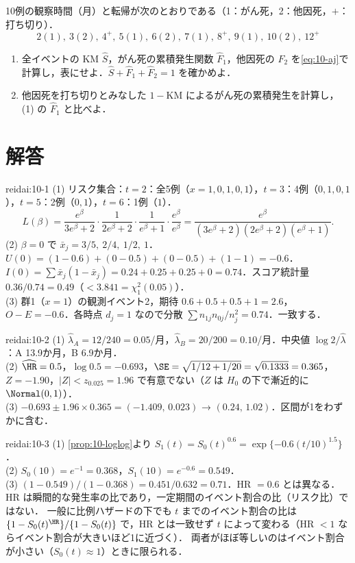 \begin{reidai}[累積発生関数の推定]\label{reidai:10-5}
10例の観察時間（月）と転帰が次のとおりである（1：がん死，2：他因死，$+$：打ち切り）．
\[
2(1),\ 3(2),\ 4^+,\ 5(1),\ 6(2),\ 7(1),\ 8^+,\ 9(1),\ 10(2),\ 12^+
\]
\begin{enumerate}[label=(\arabic*)]
\item 全イベントの KM $\hat S$，がん死の累積発生関数 $\hat F_1$，他因死の $\hat F_2$ を\cref{eq:10-aj}で計算し，表にせよ．$\hat S+\hat F_1+\hat F_2=1$ を確かめよ．
\item 他因死を打ち切りとみなした $1-\mathrm{KM}$ によるがん死の累積発生を計算し，(1) の $\hat F_1$ と比べよ．
\end{enumerate}
\end{reidai}

\section{解答}\label{sec:10-sol}
\begin{kaitou}{reidai:10-1}
(1) リスク集合：$t=2$：全5例（$x=1,0,1,0,1$），$t=3$：4例（$0,1,0,1$），$t=5$：2例（$0,1$），$t=6$：1例（$1$）．
\[
L(\beta)=\frac{e^\beta}{3e^\beta+2}\cdot\frac{1}{2e^\beta+2}\cdot\frac{1}{e^\beta+1}\cdot\frac{e^\beta}{e^\beta}
=\frac{e^\beta}{(3e^\beta+2)(2e^\beta+2)(e^\beta+1)}.
\]
(2) $\beta=0$ で $\bar x_j=3/5,\ 2/4,\ 1/2,\ 1$．$U(0)=(1-0.6)+(0-0.5)+(0-0.5)+(1-1)=-0.6$．
$I(0)=\sum\bar x_j(1-\bar x_j)=0.24+0.25+0.25+0=0.74$．スコア統計量 $0.36/0.74=0.49$（$<3.841=\chi^2_1(0.05)$）．\\
(3) 群1（$x=1$）の観測イベント2，期待 $0.6+0.5+0.5+1=2.6$，$O-E=-0.6$．各時点 $d_j=1$ なので分散 $\sum n_{1j}n_{0j}/n_j^2=0.74$．一致する．
\end{kaitou}

\begin{kaitou}{reidai:10-2}
(1) $\hat\lambda_A=12/240=0.05$/月，$\hat\lambda_B=20/200=0.10$/月．中央値 $\log2/\hat\lambda$：A 13.9か月，B 6.9か月．\\
(2) $\widehat{\HR}=0.5$，$\log0.5=-0.693$，$\SE=\sqrt{1/12+1/20}=\sqrt{0.1333}=0.365$，$Z=-1.90$，$|Z|<z_{0.025}=1.96$ で有意でない（$Z$ は $H_0$ の下で漸近的に $\Normal(0,1)$）．\\
(3) $-0.693\pm1.96\times0.365=(-1.409,\,0.023)$ → $(0.24,\,1.02)$．区間が1をわずかに含む．
\end{kaitou}

\begin{kaitou}{reidai:10-3}
(1) \cref{prop:10-loglog}より $S_1(t)=S_0(t)^{0.6}=\exp\{-0.6(t/10)^{1.5}\}$．\\
(2) $S_0(10)=e^{-1}=0.368$，$S_1(10)=e^{-0.6}=0.549$．\\
(3) $(1-0.549)/(1-0.368)=0.451/0.632=0.71$．HR $=0.6$ とは異なる．HR は瞬間的な発生率の比であり，一定期間のイベント割合の比（リスク比）ではない．
一般に比例ハザードの下でも $t$ までのイベント割合の比は $\{1-S_0(t)^{\HR}\}/\{1-S_0(t)\}$ で，HR とは一致せず $t$ によって変わる（HR $<1$ ならイベント割合が大きいほど1に近づく）．
両者がほぼ等しいのはイベント割合が小さい（$S_0(t)\approx1$）ときに限られる．
\end{kaitou}

